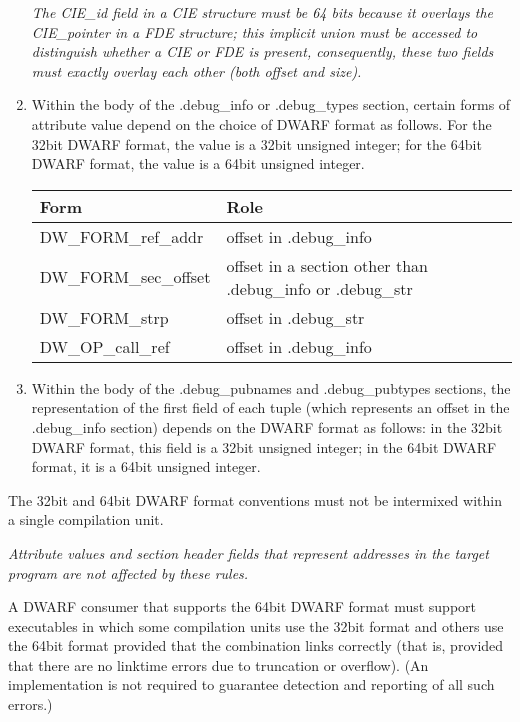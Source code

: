 \begin{enumerate}[1.]
\begin{center}
\begin{tabular}{lll}
\end{tabular}
\end{center}

\textit{The CIE\_id field in a CIE structure must be 64 bits because
it overlays the CIE\_pointer in a FDE structure; this implicit
union must be accessed to distinguish whether a CIE or FDE is
present, consequently, these two fields must exactly overlay
each other (both offset and size).}

\item Within the body of the .debug\_info or .debug\_types
section, certain forms of attribute value depend on the choice
of DWARF format as follows. For the 32\dash bit DWARF format,
the value is a 32\dash bit unsigned integer; for the 64\dash bit DWARF
format, the value is a 64\dash bit unsigned integer.
\begin{center}
\begin{tabular}{lll}
Form & Role  \\ \hline
DW\_FORM\_ref\_addr& offset in .debug\_info \\
DW\_FORM\_sec\_offset& offset in a section other than .debug\_info or .debug\_str \\
DW\_FORM\_strp&offset in .debug\_str \\
DW\_OP\_call\_ref&offset in .debug\_info \\
\end{tabular}
\end{center}

\item Within the body of the .debug\_pubnames and
.debug\_pubtypes sections, the representation of the first field
of each tuple (which represents an offset in the .debug\_info
section) depends on the DWARF format as follows: in the
32\dash bit DWARF format, this field is a 32\dash bit unsigned integer;
in the 64\dash bit DWARF format, it is a 64\dash bit unsigned integer.

\end{enumerate}


The 32\dash bit and 64\dash bit DWARF format conventions must not be
intermixed within a single compilation unit.

\textit{Attribute values and section header fields that represent
addresses in the target program are not affected by these
rules.}

A DWARF consumer that supports the 64\dash bit DWARF format must
support executables in which some compilation units use the
32\dash bit format and others use the 64\dash bit format provided that
the combination links correctly (that is, provided that there
are no link\dash time errors due to truncation or overflow). (An
implementation is not required to guarantee detection and
reporting of all such errors.)

